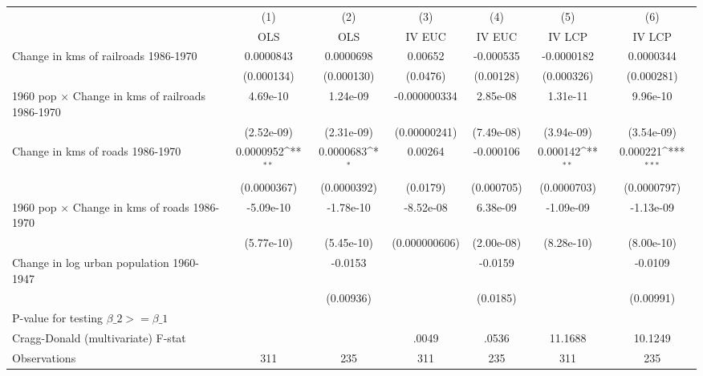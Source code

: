{
\def\sym#1{\ifmmode^{#1}\else\(^{#1}\)\fi}
\begin{tabular}{l*{6}{c}}
\hline\hline
                &\multicolumn{1}{c}{(1)}&\multicolumn{1}{c}{(2)}&\multicolumn{1}{c}{(3)}&\multicolumn{1}{c}{(4)}&\multicolumn{1}{c}{(5)}&\multicolumn{1}{c}{(6)}\\
                &\multicolumn{1}{c}{OLS}&\multicolumn{1}{c}{OLS}&\multicolumn{1}{c}{IV EUC}&\multicolumn{1}{c}{IV EUC}&\multicolumn{1}{c}{IV LCP}&\multicolumn{1}{c}{IV LCP}\\
\hline
Change in kms of railroads 1986-1970&0.0000843         &0.0000698         &  0.00652         &-0.000535         &-0.0000182         &0.0000344         \\
                &(0.000134)         &(0.000130)         & (0.0476)         &(0.00128)         &(0.000326)         &(0.000281)         \\
[1em]
1960 pop $\times$ Change in kms of railroads 1986-1970& 4.69e-10         & 1.24e-09         &-0.000000334         & 2.85e-08         & 1.31e-11         & 9.96e-10         \\
                &(2.52e-09)         &(2.31e-09)         &(0.00000241)         &(7.49e-08)         &(3.94e-09)         &(3.54e-09)         \\
[1em]
Change in kms of roads 1986-1970&0.0000952\sym{**} &0.0000683\sym{*}  &  0.00264         &-0.000106         & 0.000142\sym{**} & 0.000221\sym{***}\\
                &(0.0000367)         &(0.0000392)         & (0.0179)         &(0.000705)         &(0.0000703)         &(0.0000797)         \\
[1em]
1960 pop $\times$ Change in kms of roads 1986-1970&-5.09e-10         &-1.78e-10         &-8.52e-08         & 6.38e-09         &-1.09e-09         &-1.13e-09         \\
                &(5.77e-10)         &(5.45e-10)         &(0.000000606)         &(2.00e-08)         &(8.28e-10)         &(8.00e-10)         \\
[1em]
Change in log urban population 1960-1947&                  &  -0.0153         &                  &  -0.0159         &                  &  -0.0109         \\
                &                  &(0.00936)         &                  & (0.0185)         &                  &(0.00991)         \\
\hline
P-value for testing $\beta\_{2} >= \beta\_{1}$&                  &                  &                  &                  &                  &                  \\
Cragg-Donald (multivariate) F-stat&                  &                  &    .0049         &    .0536         &  11.1688         &  10.1249         \\
Observations    &      311         &      235         &      311         &      235         &      311         &      235         \\
\hline\hline
\end{tabular}
}
